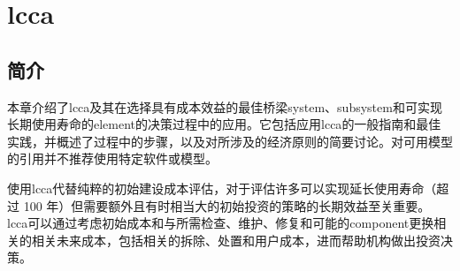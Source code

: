 \chapter[全生命周期成本分析]{\acrlong{lcca}}
\label{chp:lcca}
\section{简介}
本章介绍了\acrfull{lcca}及其在选择具有成本效益的最佳桥梁\gls*{system}、\gls*{subsystem}和可实现长期使用寿命的\gls*{element}的决策过程中的应用。它包括应用\acrlong{lcca}的一般指南和最佳实践，并概述了过程中的步骤，以及对所涉及的经济原则的简要讨论。对可用模型的引用并不推荐使用特定软件或模型。


使用\acrlong*{lcca}代替纯粹的初始建设成本评估，对于评估许多可以实现延长使用寿命（超过 100 年）但需要额外且有时相当大的初始投资的策略的长期效益至关重要。 \acrlong*{lcca}可以通过考虑初始成本和与所需检查、维护、修复和可能的\gls*{component}更换相关的相关未来成本，包括相关的拆除、处置和用户成本，进而帮助机构做出投资决策。


